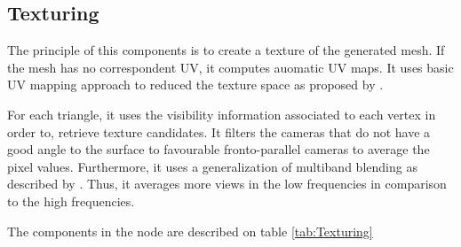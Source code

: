 \documentclass[12pt]{report}
\begin{document}
\subsection{Texturing}
The principle of this components is to create a texture of the generated mesh.
If the mesh has no correspondent UV, it computes auomatic UV maps. It uses basic UV mapping approach to reduced the texture space as proposed by .

For each triangle, it uses the visibility information associated to each vertex in order to, retrieve texture candidates.
It filters the cameras that do not have a good angle to the surface to favourable fronto-parallel cameras to average the pixel values.
Furthermore, it uses a generalization of multiband blending as described by . Thus, it averages more views in the low frequencies in comparison to the high frequencies.

The components in the node are described on table \ref{tab:Texturing}
\end{document}
